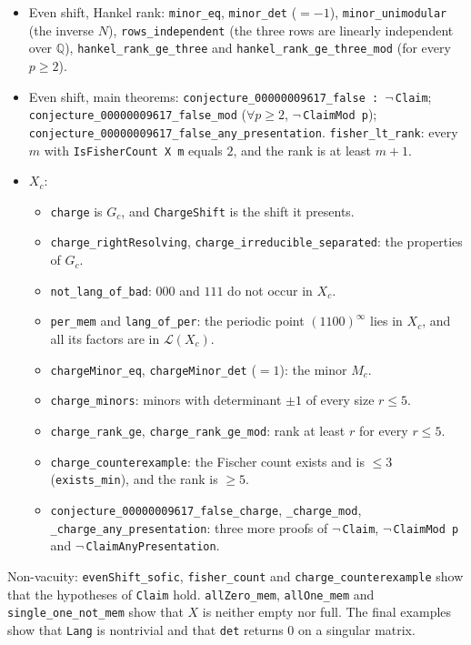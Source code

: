 \documentclass[11pt]{article}
\theoremstyle{definition}
\theoremstyle{remark}
\newcommand{\Lang}{\mathcal{L}}
\begin{document}
\begin{itemize}
\item Even shift, Hankel rank: \texttt{minor\_eq}, \texttt{minor\_det} ($=-1$),
\texttt{minor\_unimodular} (the inverse $N$), \texttt{rows\_independent} (the three rows
are linearly independent over $\mathbb Q$), \texttt{hankel\_rank\_ge\_three} and
\texttt{hankel\_rank\_ge\_three\_mod} (for every $p\ge2$).
\item Even shift, main theorems: \texttt{conjecture\_00000009617\_false :}~$\neg$\,\texttt{Claim};
\texttt{conjecture\_00000009617\_false\_mod} ($\forall p\ge 2$, $\neg$\,\texttt{ClaimMod p});
\texttt{conjecture\_00000009617\_false\_any\_presentation}. \texttt{fisher\_lt\_rank}:
every $m$ with \texttt{IsFisherCount X m} equals $2$, and the rank is at least $m+1$.
\item $X_c$:
  \begin{itemize}
  \item \texttt{charge} is $G_c$, and \texttt{ChargeShift} is the shift it presents.
  \item \texttt{charge\_rightResolving}, \texttt{charge\_irreducible\_separated}:
  the properties of $G_c$.
  \item \texttt{not\_lang\_of\_bad}: $000$ and $111$ do not occur in $X_c$.
  \item \texttt{per\_mem} and \texttt{lang\_of\_per}: the periodic point $(1100)^\infty$
  lies in $X_c$, and all its factors are in $\Lang(X_c)$.
  \item \texttt{chargeMinor\_eq}, \texttt{chargeMinor\_det} ($=1$): the minor $M_c$.
  \item \texttt{charge\_minors}: minors with determinant $\pm1$ of every size $r\le5$.
  \item \texttt{charge\_rank\_ge}, \texttt{charge\_rank\_ge\_mod}: rank at least $r$ for every $r\le 5$.
  \item \texttt{charge\_counterexample}: the Fischer count exists and is $\le 3$
  (\texttt{exists\_min}), and the rank is $\ge 5$.
  \item \texttt{conjecture\_00000009617\_false\_charge}, \texttt{\_charge\_mod},
  \texttt{\_charge\_any\_presentation}: three more proofs of $\neg$\,\texttt{Claim},
  $\neg$\,\texttt{ClaimMod p} and $\neg$\,\texttt{ClaimAnyPresentation}.
  \end{itemize}
\end{itemize}
Non-vacuity: \texttt{evenShift\_sofic}, \texttt{fisher\_count} and
\texttt{charge\_counterexample} show that the hypotheses of \texttt{Claim} hold.
\texttt{allZero\_mem}, \texttt{allOne\_mem} and \texttt{single\_one\_not\_mem} show
that $X$ is neither empty nor full. The final examples show that \texttt{Lang} is
nontrivial and that \texttt{det} returns $0$ on a singular matrix.
\end{document}
